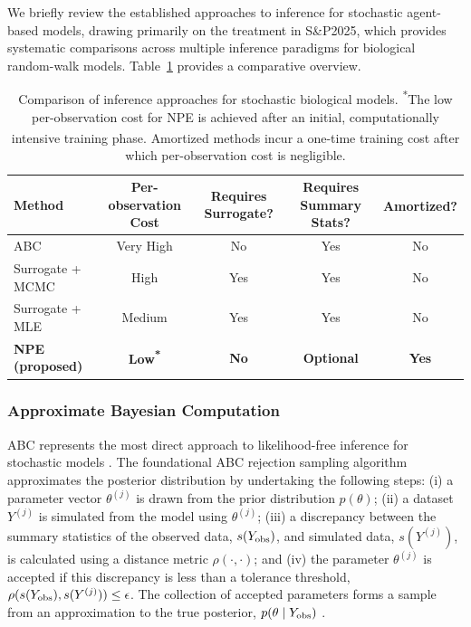 \documentclass{article}
\newcommand{\SP}{S\&P2025}
\begin{document}
We briefly review the established approaches to inference for stochastic agent-based models, drawing primarily on the treatment in \SP, which provides systematic comparisons across multiple inference paradigms for biological random-walk models. Table~\ref{tab:method_comparison} provides a comparative overview.

\begin{table}[htbp]
	\centering
	\renewcommand{\arraystretch}{1.3} %
	\begin{tabular}{@{}lcccc@{}}
		\toprule
		\textbf{Method} & \textbf{Per-observation Cost} & \textbf{Requires Surrogate?} & \textbf{Requires Summary Stats?} & \textbf{Amortized?\textsuperscript{\dag}} \\
		\midrule
		ABC & Very High & No & Yes & No \\
		Surrogate + MCMC & High & Yes & Yes & No \\
		Surrogate + MLE & Medium & Yes & Yes & No \\
		\textbf{NPE (proposed)} & \textbf{Low\textsuperscript{*}} & \textbf{No} & \textbf{Optional} & \textbf{Yes} \\
		\bottomrule
	\end{tabular}
	\vspace{0.2cm}
	\caption{Comparison of inference approaches for stochastic biological models. \textsuperscript{*}The low per-observation cost for NPE is achieved after an initial, computationally intensive training phase. \textsuperscript{\dag}Amortized methods incur a one-time training cost after which per-observation cost is negligible.}
	\label{tab:method_comparison}
\end{table}

\subsubsection{Approximate Bayesian Computation}

ABC represents the most direct approach to likelihood-free inference for stochastic models \citep{SunnkerABC,Sisson2018,Tavare1997,Pritchard1999}. The foundational ABC rejection sampling algorithm approximates the posterior distribution by undertaking the following steps: (i) a parameter vector $\theta^{(j)}$ is drawn from the prior distribution $p(\theta)$; (ii) a dataset $Y^{(j)}$ is simulated from the model using $\theta^{(j)}$; (iii) a discrepancy between the summary statistics of the observed data, $s(Y_{\rm obs})$, and simulated data, $s(Y^{(j)})$, is calculated using a distance metric $\rho(\cdot, \cdot)$; and (iv) the parameter $\theta^{(j)}$ is accepted if this discrepancy is less than a tolerance threshold, $\rho(s(Y_{\rm obs}), s(Y^{(j)})) \le \epsilon$. The collection of accepted parameters forms a sample from an approximation to the true posterior, $p(\theta \mid Y_{\rm obs})$ \citep{Beaumont2002}.
\end{document}
